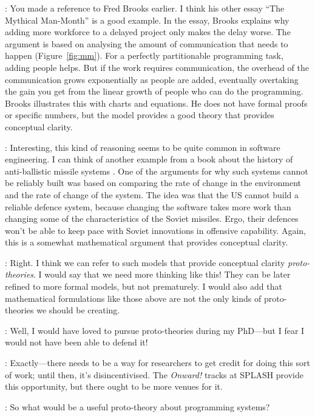 \documentclass[runningheads]{llncs}
\newcommand{\T}{Tomas}
\newcommand{\J}{Joel}
\newcommand{\says}[2][gg]{\vspace{0.5em}\noindent\hangindent=0.5cm{\textsc{#1}}: #2}
\begin{document}
\says[\J]{You made a reference to Fred Brooks earlier. I think his other essay ``The Mythical Man-Month'' \cite{brooks-1975-manmonth} is a good example. In the essay, Brooks explains why adding more workforce to a delayed project only makes the delay worse. The argument is based on analysing the amount of communication that needs to happen (Figure~\ref{fig:mm}). For a perfectly partitionable programming task, adding people helps. But if the work requires communication, the overhead of the communication grows exponentially as people are added, eventually overtaking the gain you get from the linear growth of people who can do the programming. Brooks illustrates this with charts and equations. He does not have formal proofs or specific numbers, but the model provides a good theory that provides conceptual clarity.}

\says[\T]{Interesting, this kind of reasoning seems to be quite common in software engineering. I can think of another example from a book about the history of anti-ballistic missile systems \cite{slayton-2013-arguments}. One of the arguments for why such systems cannot be reliably built was based on comparing the rate of change in the environment and the rate of change of the system. The idea was that the US cannot build a reliable defence system, because changing the software takes more work than changing some of the characteristics of the Soviet missiles. Ergo, their defences won't be able to keep pace with Soviet innovations in offensive capability. Again, this is a somewhat mathematical argument that provides conceptual clarity.}

\says[\J]{Right. I think we can refer to such models that provide conceptual clarity \emph{proto-theories}. I would say that we need more thinking like this! They can be later refined to more formal models, but not prematurely. I would also add that mathematical formulations like those above are not the only kinds of proto-theories we should be creating.}

\says[\T]{Well, I would have loved to pursue proto-theories during my PhD---but I fear I would not have been able to defend it!}

\says[\J]{Exactly---there needs to be a way for researchers to get credit for doing this sort of work; until then, it's disincentivised. The \emph{Onward!} tracks at SPLASH provide this opportunity, but there ought to be more venues for it.}

\says[\T]{So what would be a useful proto-theory about programming systems?}
\end{document}
